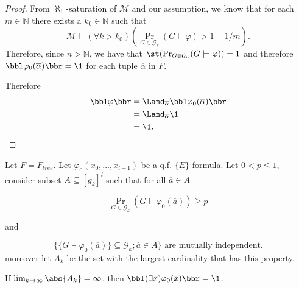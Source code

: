 \begin{proof}

From $\aleph_1$-saturation of $\mathcal{M}$ and our assumption, we know that for each $m\in\mathbb{N}$ there exists a $k_0\in\mathbb{N}$ such that \[\mathcal{M}\models(\forall k>k_0)\left(\Pr_{G\in\mathcal{G}_k}(G\models \varphi)>1-1/m\right).\]
Therefore, since $n>\mathbb{N}$, we have that $\st(\Pr_{G\in\mathcal{G}_n}(G\models\varphi))=1$ and therefore $\bbl\varphi_0(\overline\alpha)\bbr=\1$ for each tuple $\overline\alpha$ in $F$.

Therefore
\begin{align}
\bbl\varphi\bbr&=\Land_{\overline\alpha}\bbl\varphi_0(\overline\alpha)\bbr\\
&=\Land_{\overline\alpha}\1\\
&=\1.
\end{align}
\end{proof}

\begin{thrm}\label{mutindfind}
Let $F=F_{tree}$. Let $\varphi_0(x_0,\dots,x_{l-1})$ be a q.f. $\{E\}$-formula. Let $0<p\leq 1$, consider subset $A\subseteq[g_k]^l$ such that for all $\overline a \in A$ 

\[\Pr_{G\in\mathcal{G}_k}(G\models \varphi_0(\overline a))\geq p\]

and

\[\text{$\{\{G\models\varphi_0(\overline a)\}\subseteq \mathcal{G}_k;\overline a \in A\}$ are mutually independent.}\]
moreover let $A_k$ be the set with the largest cardinality that  has this property.

If $\lim_{k\to\infty} \abs{A_k}=\infty$, then $\bbl(\exists \overline x)\varphi_0(\overline x)\bbr=\1$.
\end{thrm}

